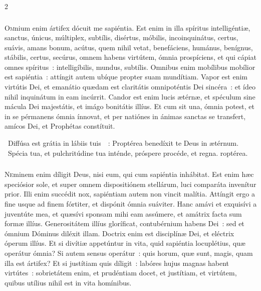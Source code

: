 \documentclass[9pt,twoside]{extarticle}
\begin{document}
\begin{multicols}{2}
{{\subsubsection*{\center {}}
\lettrine{O}mnium enim ártifex dócuit me sapiéntia. Est enim in illa spíritus intelligéntiæ, sanctus, únicus, múltiplex, subtílis, disértus, móbilis, incoinquinátus, certus, suávis, amans bonum, acútus, quem nihil vetat, benefáciens, humánus, benígnus, stábilis, certus, secúrus, omnem habens virtútem, ómnia prospíciens, et qui cápiat omnes spíritus~: intelligíbilis, mundus, subtílis. Omnibus enim mobílibus mobílior est sapiéntia~: attíngit autem ubíque propter suam mundítiam. Vapor est enim virtútis Dei, et emanátio quædam est claritátis omnipoténtis Dei sincéra~: et ídeo nihil inquinátum in eam incúrrit. Candor est enim lucis ætérnæ, et spéculum sine mácula Dei majestátis, et imágo bonitátis illíus. Et cum sit una, ómnia potest, et in se pérmanens ómnia ínnovat, et per natiónes in ánimas sanctas se transfert, amícos Dei, et Prophétas constítuit.

\begin{tightlist}{}
\item {}~Diffúsa est grátia in lábiis tuis~~: \textred{*} Proptérea benedíxit te Deus in ætérnum. ~Spécia tua, et pulchritúdine tua inténde, próspere procéde, et regna. roptérea.
\end{tightlist}

\subsubsection*{\center {}}
\lettrine{N}eminem enim díligit Deus, nisi eum, qui cum sapiéntia inhábitat. Est enim hæc speciósior sole, et super omnem dispositiónem stellárum, luci comparáta invenítur prior. Illi enim succédit nox, sapiéntiam autem non vincit malítia. Attíngit ergo a fine usque ad finem fórtiter, et dispónit ómnia suáviter. Hanc amávi et exquisívi a juventúte mea, et quæsívi sponsam mihi eam assúmere, et amátrix facta sum formæ illíus. Generositátem illíus gloríficat, contubérnium habens Dei~: sed et ómnium Dóminus diléxit illam. Doctrix enim est disciplínæ Dei, et eléctrix óperum illíus. Et si divítiæ appetúntur in vita, quid sapiéntia locuplétius, quæ operátur ómnia? Si autem sensus operátur~: quis horum, quæ sunt, magis, quam illa est ártifex? Et si justítiam quis díligit~: labóres hujus magnas habent virtútes~: sobrietátem enim, et prudéntiam docet, et justítiam, et virtútem, quibus utílius nihil est in vita homínibus.

}}
\end{multicols}
\end{document}
